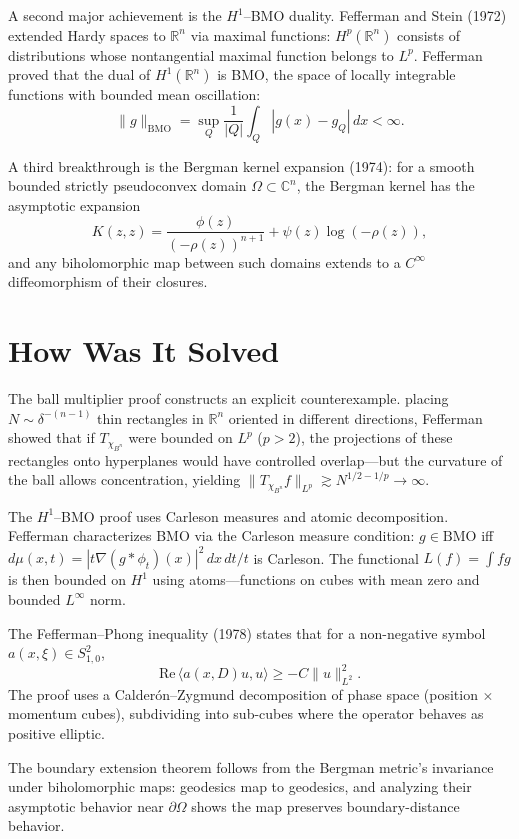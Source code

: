 A second major achievement is the $H^1$--BMO duality. Fefferman and
Stein (1972) extended Hardy spaces to $\mathbb{R}^n$ via maximal
functions: $H^p(\mathbb{R}^n)$ consists of distributions whose
nontangential maximal function belongs to $L^p$. Fefferman proved that
the dual of $H^1(\mathbb{R}^n)$ is BMO, the space of locally integrable
functions with bounded mean oscillation:
\[
\|g\|_{\mathrm{BMO}} = \sup_Q \frac{1}{|Q|} \int_Q |g(x) - g_Q|\, dx < \infty.
\]

A third breakthrough is the Bergman kernel expansion (1974): for a smooth
bounded strictly pseudoconvex domain $\Omega \subset \mathbb{C}^n$, the
Bergman kernel has the asymptotic expansion
\[
K(z,z) = \frac{\phi(z)}{(-\rho(z))^{n+1}} + \psi(z)\log(-\rho(z)),
\]
and any biholomorphic map between such domains extends to a
$C^\infty$ diffeomorphism of their closures.

\section{How Was It Solved}

The ball multiplier proof constructs an explicit counterexample. placing
$N \sim \delta^{-(n-1)}$ thin rectangles in $\mathbb{R}^n$ oriented in
different directions, Fefferman showed that if $T_{\chi_{B^n}}$ were
bounded on $L^p$ ($p > 2$), the projections of these rectangles onto
hyperplanes would have controlled overlap---but the curvature of the
ball allows concentration, yielding
$\|T_{\chi_{B^n}} f\|_{L^p} \gtrsim N^{1/2 - 1/p} \to \infty$.

The $H^1$--BMO proof uses Carleson measures and atomic decomposition.
Fefferman characterizes BMO via the Carleson measure condition: $g \in
\mathrm{BMO}$ iff $d\mu(x,t) = |t \nabla(g * \phi_t)(x)|^2\, dx\, dt /
t$ is Carleson. The functional $L(f) = \int fg$ is then bounded on
$H^1$ using atoms---functions on cubes with mean zero and bounded
$L^\infty$ norm.

The Fefferman--Phong inequality (1978) states that for a non-negative
symbol $a(x,\xi) \in S^2_{1,0}$,
\[
\mathrm{Re}\,\langle a(x,D)u, u\rangle \ge -C\|u\|_{L^2}^2.
\]
The proof uses a Calder\'{o}n--Zygmund decomposition of phase space
(position $\times$ momentum cubes), subdividing into sub-cubes where
the operator behaves as positive elliptic.

The boundary extension theorem follows from the Bergman metric's
invariance under biholomorphic maps: geodesics map to geodesics, and
analyzing their asymptotic behavior near $\partial\Omega$ shows the map
preserves boundary-distance behavior.

